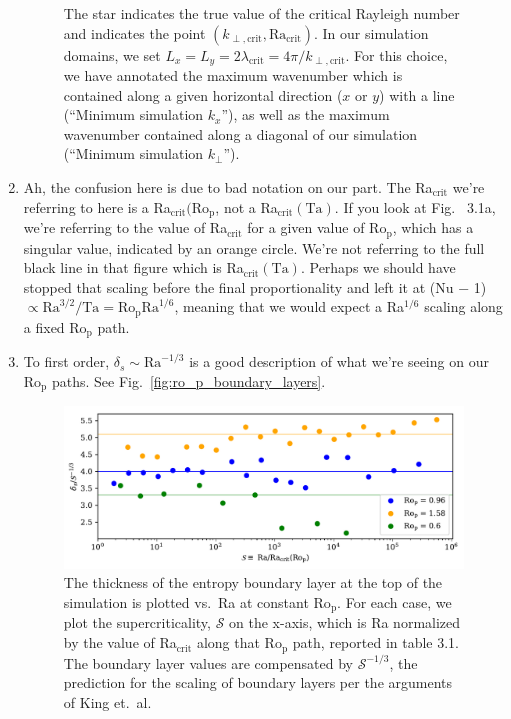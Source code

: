 \documentclass[aps, pre, onecolumn, nofootinbib, notitlepage, groupedaddress, amsfonts, amssymb, amsmath, longbibliography, superscriptaddress]{revtex4-1}
\begin{document}
\begin{enumerate}
\begin{figure}[t!]
{	The star indicates the true value of the critical Rayleigh number and indicates the point $(k_{\perp, \text{crit}}, \text{Ra}_{\text{crit}})$.
	In our simulation domains, we set $L_x = L_y = 2 \lambda_\text{crit} = 4\pi / k_{\perp, \text{crit}}$.
	For this choice, we have annotated the maximum wavenumber which is contained along a given horizontal direction ($x$ or $y$) with a line (``Minimum simulation $k_x$''), as well as the maximum wavenumber contained along a diagonal of our simulation (``Minimum simulation $k_\perp$'').
	\label{fig:ta1e10_onset} }
\end{figure}
\item Ah, the confusion here is due to bad notation on our part.
The Ra$_{\text{crit}}$ we're referring to here is a Ra$_{\text{crit}}(\text{Ro}_{\text{p}}$, not a Ra$_{\text{crit}}(\text{Ta})$.
If you look at Fig.~ 3.1a, we're referring to the value of Ra$_{\text{crit}}$ for a given value of $\text{Ro}_\text{p}$, which has a singular value, indicated by an orange circle.
We're not referring to the full black line in that figure which is Ra$_{\text{crit}}(\text{Ta})$.
Perhaps we should have stopped that scaling before the final proportionality and left it at (Nu − 1) $\propto \text{Ra}^{3/2} / \text{Ta} = \text{Ro}_{\text{p}} \text{Ra}^{1/6}$, meaning that we would expect a Ra$^{1/6}$ scaling along a fixed Ro$_{\text{p}}$ path.
\item To first order, $\delta_s \sim \text{Ra}^{-1/3}$ is a good description of what we're seeing on our Ro$_\text{p}$ paths.
See Fig.~\ref{fig:ro_p_boundary_layers}.
\begin{figure}[t!]
\includegraphics[width=\textwidth]{./figs/ro_p_boundary_layers.pdf}
\caption{ 
	The thickness of the entropy boundary layer at the top of the simulation is plotted vs.~Ra at constant Ro$_{\text{p}}$.
	For each case, we plot the supercriticality, $\mathcal{S}$ on the x-axis, which is Ra normalized by the value of Ra$_{\text{crit}}$ along that Ro$_{\text{p}}$ path, reported in table 3.1.
	The boundary layer values are compensated by $\mathcal{S}^{-1/3}$, the prediction for the scaling of boundary layers per the arguments of King et.~al.
}
\end{figure}
\end{enumerate}
\end{document}
